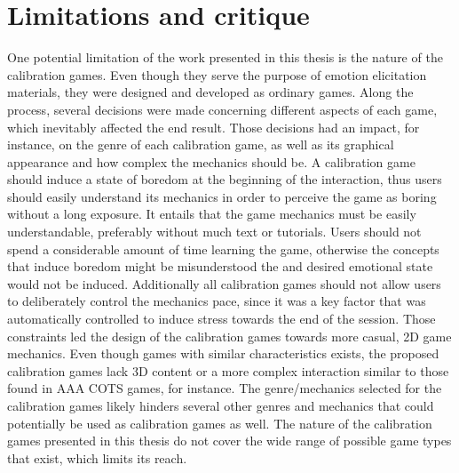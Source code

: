 \chapter{Limitations and critique}
\label{ch:limitations}

One potential limitation of the work presented in this thesis is the nature of the calibration games. Even though they serve the purpose of emotion elicitation materials, they were designed and developed as ordinary games. Along the process, several decisions were made concerning different aspects of each game, which inevitably affected the end result. Those decisions had an impact, for instance, on the genre of each calibration game, as well as its graphical appearance and how complex the mechanics should be. A calibration game should induce a state of boredom at the beginning of the interaction, thus users should easily understand its mechanics in order to perceive the game as boring without a long exposure. It entails that the game mechanics must be easily understandable, preferably without much text or tutorials. Users should not spend a considerable amount of time learning the game, otherwise the concepts that induce boredom might be misunderstood the and desired emotional state would not be induced. Additionally all calibration games should not allow users to deliberately control the mechanics pace, since it was a key factor that was automatically controlled to induce stress towards the end of the session. Those constraints led the design of the calibration games towards more casual, 2D game mechanics. Even though games with similar characteristics exists, the proposed calibration games lack 3D content or a more complex interaction similar to those found in AAA COTS games, for instance. The genre/mechanics selected for the calibration games likely hinders several other genres and mechanics that could potentially be used as calibration games as well. The nature of the calibration games presented in this thesis do not cover the wide range of possible game types that exist, which limits its reach.

